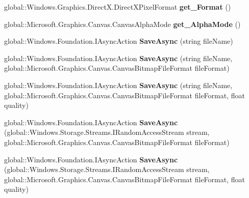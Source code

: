 \begin{DoxyCompactItemize}
global\+::\+Windows.\+Graphics.\+Direct\+X.\+Direct\+X\+Pixel\+Format {\bfseries get\+\_\+\+Format} ()
\item 
\mbox{\label{interface_microsoft_1_1_graphics_1_1_canvas_1_1_i_canvas_bitmap_ab31c90d55255a3b262b19e7af008fb29}} 
global\+::\+Microsoft.\+Graphics.\+Canvas.\+Canvas\+Alpha\+Mode {\bfseries get\+\_\+\+Alpha\+Mode} ()
\item 
\mbox{\label{interface_microsoft_1_1_graphics_1_1_canvas_1_1_i_canvas_bitmap_ac4992fe87b3aa1e80423da03fcea6acf}} 
global\+::\+Windows.\+Foundation.\+I\+Async\+Action {\bfseries Save\+Async} (string file\+Name)
\item 
\mbox{\label{interface_microsoft_1_1_graphics_1_1_canvas_1_1_i_canvas_bitmap_aca107d6a479f4ea4b88f2265a278dedc}} 
global\+::\+Windows.\+Foundation.\+I\+Async\+Action {\bfseries Save\+Async} (string file\+Name, global\+::\+Microsoft.\+Graphics.\+Canvas.\+Canvas\+Bitmap\+File\+Format file\+Format)
\item 
\mbox{\label{interface_microsoft_1_1_graphics_1_1_canvas_1_1_i_canvas_bitmap_aa1b618fcc1333742a9cd060b9c7fdae5}} 
global\+::\+Windows.\+Foundation.\+I\+Async\+Action {\bfseries Save\+Async} (string file\+Name, global\+::\+Microsoft.\+Graphics.\+Canvas.\+Canvas\+Bitmap\+File\+Format file\+Format, float quality)
\item 
\mbox{\label{interface_microsoft_1_1_graphics_1_1_canvas_1_1_i_canvas_bitmap_a5dcf0ab30780f638bbfddc389d7b02db}} 
global\+::\+Windows.\+Foundation.\+I\+Async\+Action {\bfseries Save\+Async} (global\+::\+Windows.\+Storage.\+Streams.\+I\+Random\+Access\+Stream stream, global\+::\+Microsoft.\+Graphics.\+Canvas.\+Canvas\+Bitmap\+File\+Format file\+Format)
\item 
\mbox{\label{interface_microsoft_1_1_graphics_1_1_canvas_1_1_i_canvas_bitmap_afdef00bc9d9842506f809195ede3782f}} 
global\+::\+Windows.\+Foundation.\+I\+Async\+Action {\bfseries Save\+Async} (global\+::\+Windows.\+Storage.\+Streams.\+I\+Random\+Access\+Stream stream, global\+::\+Microsoft.\+Graphics.\+Canvas.\+Canvas\+Bitmap\+File\+Format file\+Format, float quality)

\end{DoxyCompactItemize}
